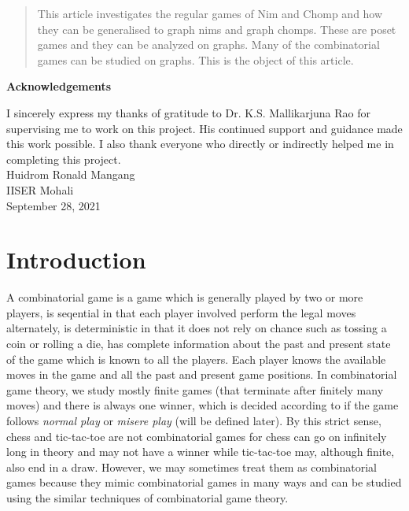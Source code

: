\documentclass[a4paper, 12pt]{article}
\theoremstyle{remark} %
\begin{document}

\thispagestyle{empty}
\begin{abstract}
	This article investigates the regular games of Nim and Chomp and how they can be generalised to graph nims and graph chomps. These are poset games and they can be analyzed on graphs. Many of the combinatorial games can be studied on graphs. This is the object of this article.\\
\end{abstract}

\clearpage
\thispagestyle{empty}
\begin{center}
	\textbf{Acknowledgements}
\end{center}

I sincerely express my thanks of gratitude to Dr. K.S. Mallikarjuna Rao for supervising me to work on this project. His continued support and guidance made this work possible. I also thank everyone who directly or indirectly helped me in completing this project.\\

\noindent Huidrom Ronald Mangang\\
IISER Mohali\\
September 28, 2021\\

\clearpage


\thispagestyle{empty}
\tableofcontents
\clearpage


\section{Introduction}

A combinatorial game is a game which is generally played by two or more players, is seqential in that each player involved perform the legal moves alternately, is deterministic in that it does not rely on chance such as tossing a coin or rolling a die, has complete information about the past and present state of the game which is known to all the players. Each player knows the available moves in the game and all the past and present game positions. In combinatorial game theory, we study mostly finite games (that terminate after finitely many moves) and there is always one winner, which is decided according to if the game follows \textit{normal play} or \textit{misere play} (will be defined later). By this strict sense, chess and tic-tac-toe are not combinatorial games for chess can go on infinitely long in theory and may not have a winner while tic-tac-toe may, although finite, also end in a draw. However, we may sometimes treat them as combinatorial games because they mimic combinatorial games in many ways and can be studied using the similar techniques of combinatorial game theory.\\
\end{document}
